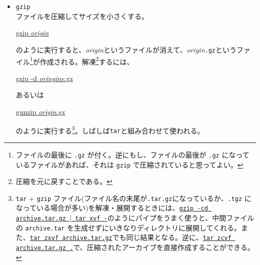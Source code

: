 \begin{itemize}
  ファイルをまとめて一つにまとめる。{\bf t}ape {\bf ar}chiverの略である。ファイルを転送したり、バックアップを取るときに利用する。
  \begin{commandline2}
    \prompt \underline{tar cvf ../archive.tar .}
  \end{commandline2} \noindent
  のように使うと、{\tt ../archive.tar} というファイル\footnote{ファイル名の最後に {\tt .tar} を付ける習慣にしておくと、あとで混乱が少なくなる。}にカレントディレクトリ以下のすべてのファイルのバックアップが取られる。{\tt .} の代わりに {\tt $\ast$.c} を使えば カレントディレクトリの {\tt .c} で終るファイルがまとめられる。また、{\tt .} の部分にディレクトリを指定すれば、そのディレクトリ以下のファイルすべてのバックアップを取ることができる。反対に展開するときは、
  \begin{commandline2}
    \prompt \underline{tar xvf archive.tar}
  \end{commandline2} \noindent
  のようにする。
\item {\tt gzip}\\
ファイルを圧縮してサイズを小さくする。
\begin{commandline2}
\prompt \underline{gzip {\it origin}}
\end{commandline2} \noindent
のように実行すると、{\it origin}というファイルが消えて、{\it origin}{\tt .gz}というファイル\footnote{ファイルの最後に {\tt .gz} が付く。逆にもし、ファイルの最後が {\tt .gz} になっているファイルがあれば、それは {\tt gzip} で圧縮されていると思ってよい。}が作成される。解凍\footnote{圧縮を元に戻すことである。}するには、
\begin{commandline2}
\prompt \underline{gzip -d {\it oringine}.gz}
\end{commandline2} \noindent
あるいは
\begin{commandline2}
\prompt \underline{gunzip {\it origin}.gz}
\end{commandline2} \noindent
のように実行する\footnote{{\tt tar} + {\tt gzip} ファイル(ファイル名の末尾が{\tt .tar.gz}になっているか、{\tt .tgz} になっている場合が多い)を解凍・展開するときには、{\tt \underline{gzip -cd archive.tar.gz $|$ tar xvf -}}のようにパイプをうまく使うと、中間ファイルの {\tt archive.tar} を生成せずにいきなりディレクトリに展開してくれる。また、\underline{\tt tar zxvf archive.tar.gz}でも同じ結果となる。逆に、\underline{\tt tar zcvf archive.tar.gz .}で、圧縮されたアーカイブを直接作成することができる。}。しばしば{\tt tar}と組み合わせて使われる。

\end{itemize}
